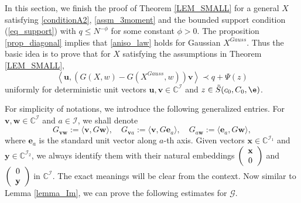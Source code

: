 In this section, we finish the proof of Theorem \ref{LEM_SMALL} for a general $X$ satisfying \eqref{conditionA2}, \eqref{assm_3moment} and the bounded support condition (\ref{eq_support}) with $q\le N^{-\phi}$ for some constant $\phi>0$. 
The proposition \ref{prop_diagonal} implies that \eqref{aniso_law} holds for Gaussian $X^{Gauss}$. Thus the basic idea is to prove that for $X$ satisfying the assumptions in Theorem \ref{LEM_SMALL}, %
\begin{equation*}%
\left\langle \mathbf u, \left( G(X,w) -  G(X^{Gauss},w)\right) \mathbf v\right\rangle \prec q+\Psi(z)
\end{equation*}
uniformly for deterministic unit vectors $\mathbf u,\mathbf v\in{\mathbb C}^{\mathcal I}$ and $z\in \tilde S(c_0,C_0,\e)$. 
 
For simplicity of notations, we introduce the following generalized entries. For $\mathbf v,\mathbf w \in \mathbb C^{\mathcal I}$ and $a\in \mathcal I$, we shall denote
\begin{equation}
G_{\mathbf{vw}}:=\langle \mathbf v,G\mathbf w\rangle, \quad G_{\mathbf{v}a}:=\langle \mathbf v,G\mathbf e_a\rangle, \quad G_{a\mathbf{w}}:=\langle \mathbf e_a,G\mathbf w\rangle,
\end{equation}
where $\mathbf e_a$ is the standard unit vector along $a$-th axis. Given vectors $\mathbf x\in \mathbb C^{\mathcal I_1}$ and $\mathbf y\in \mathbb C^{\mathcal I_2}$, we always identify them with their natural embeddings $\left( {\begin{array}{*{20}c}
   {\mathbf x}  \\
   0 \\
\end{array}} \right)$ and $\left( {\begin{array}{*{20}c}
   0  \\
   \mathbf y \\
\end{array}} \right)$ in $\mathbb C^{\mathcal I}$.
The exact meanings will be clear from the context. Now similar to Lemma \ref{lemma_Im}, we can prove the following estimates for $\mathcal G$.

